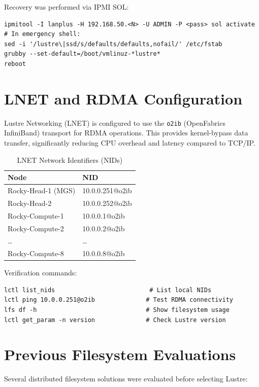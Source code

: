 Recovery was performed via IPMI SOL:

\begin{verbatim}
ipmitool -I lanplus -H 192.168.50.<N> -U ADMIN -P <pass> sol activate
# In emergency shell:
sed -i '/lustre\|ssd/s/defaults/defaults,nofail/' /etc/fstab
grubby --set-default=/boot/vmlinuz-*lustre*
reboot
\end{verbatim}

\section{LNET and RDMA Configuration}

Lustre Networking (LNET) is configured to use the \texttt{o2ib} (OpenFabrics InfiniBand) transport for RDMA operations. This provides kernel-bypass data transfer, significantly reducing CPU overhead and latency compared to TCP/IP.

\begin{table}[h]
\centering
\caption{LNET Network Identifiers (NIDs)}
\label{tab:nids}
\begin{tabular}{ll}
\hline
\textbf{Node} & \textbf{NID} \\
\hline
Rocky-Head-1 (MGS) & 10.0.0.251@o2ib \\
Rocky-Head-2 & 10.0.0.252@o2ib \\
Rocky-Compute-1 & 10.0.0.1@o2ib \\
Rocky-Compute-2 & 10.0.0.2@o2ib \\
\ldots & \ldots \\
Rocky-Compute-8 & 10.0.0.8@o2ib \\
\hline
\end{tabular}
\end{table}

Verification commands:

\begin{verbatim}
lctl list_nids                          # List local NIDs
lctl ping 10.0.0.251@o2ib              # Test RDMA connectivity
lfs df -h                              # Show filesystem usage
lctl get_param -n version              # Check Lustre version
\end{verbatim}

\section{Previous Filesystem Evaluations}

Several distributed filesystem solutions were evaluated before selecting Lustre:

